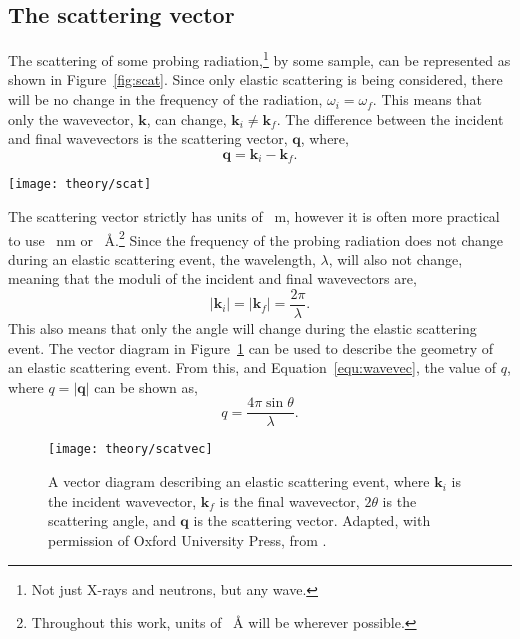 \subsection{The scattering vector}
The scattering of some probing radiation,\footnote{Not just X-rays and neutrons, but any wave.} by some sample, can be represented as shown in Figure~\ref{fig:scat}.
Since only elastic scattering is being considered, there will be no change in the frequency of the radiation, $\omega_i = \omega_f$.
This means that only the wavevector, $\mathbf{k}$, can change, $\mathbf{k}_i\neq \mathbf{k}_f$.
The difference between the incident and final wavevectors is the scattering vector, $\mathbf{q}$, where,
%
\begin{equation}
    \mathbf{q} = \mathbf{k}_i - \mathbf{k}_f.
\end{equation}
%
%
\begin{marginfigure}
    \centering
    \texttt{[image: theory/scat]}
    \caption{A schematic of the scattering of some probing radiation by a sample (blue circle). Adapted, with permission of Oxford University Press, from \cite{sivia_elementary_2011}.}
    \label{fig:scat}
\end{marginfigure}
%
The scattering vector strictly has units of \si{\per\meter}, however it is often more practical to use \si{\per\nano\meter} or \si{\per\angstrom}.\footnote{Throughout this work, units of \si{\per\angstrom} will be wherever possible.}
Since the frequency of the probing radiation does not change during an elastic scattering event, the wavelength, $\lambda$, will also not change, meaning that the moduli of the incident and final wavevectors are,
%
\begin{equation}
    |\mathbf{k}_i| = |\mathbf{k}_f| = \frac{2\pi}{\lambda}.
    \label{equ:wavevec}
\end{equation}
%
This also means that only the angle will change during the elastic scattering event.
The vector diagram in Figure~\ref{fig:scatvec} can be used to describe the geometry of an elastic scattering event.
From this, and Equation~\ref{equ:wavevec}, the value of $q$, where $q = |\mathbf{q}|$ can be shown as,
%
\begin{equation}
    q = \frac{4\pi\sin{\theta}}{\lambda}.
    \label{equ:theq}
\end{equation}
%
%
\begin{figure}[t]
    \centering
    \texttt{[image: theory/scatvec]}
    \caption{A vector diagram describing an elastic scattering event, where $\mathbf{k}_i$ is the incident wavevector, $\mathbf{k}_f$ is the final wavevector, $2\theta$ is the scattering angle, and $\mathbf{q}$ is the scattering vector. Adapted, with permission of Oxford University Press, from \cite{sivia_elementary_2011}.}
    \label{fig:scatvec}
\end{figure}
